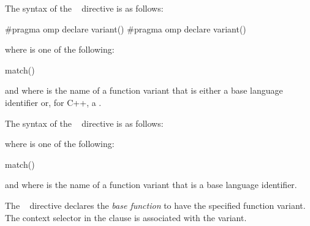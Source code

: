 \syntax
\begin{ccppspecific}
\begin{samepage}
The syntax of the ~ directive is as follows:

\begin{ompcPragma}
#pragma omp declare variant() 
\plc{[}#pragma omp declare variant() \plc{clause new-line]}
\plc{[ ... ]}
\end{ompcPragma}
\end{samepage}

\begin{samepage}
where  is one of the following{}:

\begin{indentedcodelist}
match()
\end{indentedcodelist}
\end{samepage}

and where  is the name of a function variant that is
either a base language identifier or, for C++, a .
\end{ccppspecific}

\begin{fortranspecific}
The syntax of the ~ directive is as follows:


where  is one of the following{}:

\begin{indentedcodelist}
match()
\end{indentedcodelist}

and where  is the name of a function variant that is
a base language identifier.
\end{fortranspecific}

\descr

The ~ directive declares the
\textit{base function} to have the specified function variant.
The context selector in the  clause is associated
with the variant.

